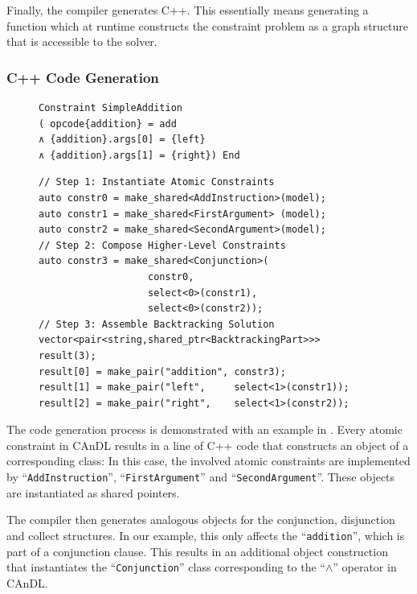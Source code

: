     Finally, the compiler generates C++.
    This essentially means generating a function which at runtime constructs
    the constraint problem as a graph structure that is accessible to the
    solver.

\subsubsection{C++ Code Generation}

\begin{figure}[t]
\centering
\begin{lstlisting}[language=CAnDL]
Constraint SimpleAddition
( opcode{addition} = add
∧ {addition}.args[0] = {left}
∧ {addition}.args[1] = {right}) End
\end{lstlisting}
\begin{lstlisting}[language=MyCpp,label={fig:codegen},caption=
   {C++ code generation: The code is generated to first instantiate atomic
    constraints, then compose higher-level constructs, and finally assemble a
    backtracking solution for solving.}]
// Step 1: Instantiate Atomic Constraints
auto constr0 = make_shared<AddInstruction>(model);
auto constr1 = make_shared<FirstArgument> (model);
auto constr2 = make_shared<SecondArgument>(model);
// Step 2: Compose Higher-Level Constraints
auto constr3 = make_shared<Conjunction>(
                   constr0,
                   select<0>(constr1),
                   select<0>(constr2));
// Step 3: Assemble Backtracking Solution
vector<pair<string,shared_ptr<BacktrackingPart>>> result(3);
result[0] = make_pair("addition", constr3);
result[1] = make_pair("left",     select<1>(constr1));
result[2] = make_pair("right",    select<1>(constr2));
\end{lstlisting}
\end{figure}

    The code generation process is demonstrated with an example in
    .
    Every atomic constraint in CAnDL results in a line of C++ code that
    constructs an object of a corresponding class:
    In this case, the involved atomic constraints are implemented by
    ``{\tt AddInstruction}'', ``{\tt FirstArgument}'' and
    ``{\tt SecondArgument}''.
    These objects are instantiated as shared pointers.

    The compiler then generates analogous objects for the conjunction,
    disjunction and collect structures.
    In our example, this only affects the ``{\tt addition}'', which is part
    of a conjunction clause.
    This results in an additional object construction that instantiates the
    ``{\tt Conjunction}'' class corresponding to the ``$\land$'' operator
    in CAnDL.

